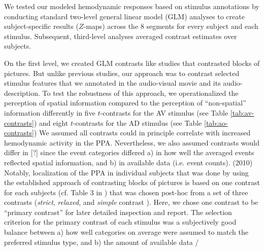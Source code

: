 \documentclass[english]{article}
\begin{document}
We tested our modeled hemodynamic responses based on stimulus annotations by
conducting standard two-level general linear model (GLM) analyses to create
subject-specific results ($Z$-maps) across the 8 segments for every subject and
each stimulus.
Subsequent, third-level analyses averaged contrast estimates over subjects.

On the first level, we created GLM contrasts like studies that contrasted blocks
of pictures.
But unlike previous studies, our approach was to contrast selected stimulus
features that we annotated in the audio-visual movie and its audio-description.
To test the robustness of this approach, we operationalized the perception of
spatial information compared to the perception of ``non-spatial'' information
differently in five $t$-contrasts for the AV stimulus (see Table
\ref{tab:av-contrasts}) and eight $t$-contrasts for the AD stimulus (see Table
\ref{tab:ao-contrasts})
We assumed all contrasts could in principle correlate with increased hemodynamic
activity in the PPA.
Nevertheless, we also assumed contrasts would differ in [?]  since the event categories differed a) in how well the
averaged events reflected spatial information, and b) in available data (i.e.
event counts).
(2010) Notably, localization of the PPA in individual subjects that was done by
\citep{sengupta2016extension} using the established approach of contrasting
blocks of pictures is based on one contrast for each subjects (cf. Table 3 in
\citep{sengupta2016extension}) that was chosen post-hoc from a set of three
contrasts (\textit{strict}, \textit{relaxed}, and \textit{simple} contrast
\citep{sengupta2016extension}).
Here, we chose one contrast to be ``primary contrast'' for later detailed
inspection and report.
The selection criterion for the primary contrast of each stimulus was a
subjectively good balance between a) how well categories on average were assumed
to match the preferred stimulus type, and b) the amount of available data /
\end{document}
